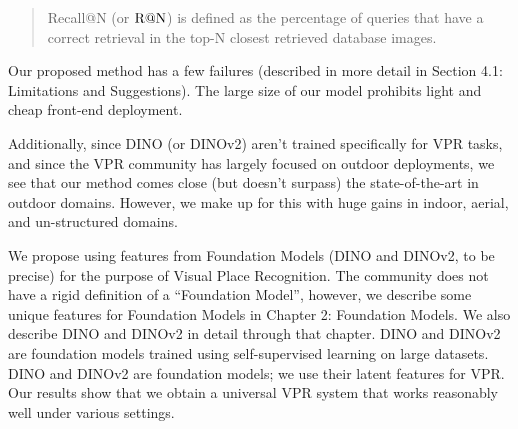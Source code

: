 \begin{quote}
    Recall@N (or $\textup{R@N}$) is defined as the percentage of
    queries that have a correct retrieval in the top-N closest
    retrieved database images.
\end{quote}


Our proposed method has a few failures (described in more detail in
Section 4.1: Limitations and Suggestions). The large size of our model
prohibits light and cheap front-end deployment.

Additionally, since DINO (or DINOv2) aren't trained specifically for
VPR tasks, and since the VPR community has largely focused on outdoor
deployments, we see that our method comes close (but doesn't surpass)
the state-of-the-art in outdoor domains. However, we make up for this
with huge gains in indoor, aerial, and un-structured domains.


We propose using features from Foundation Models (DINO and DINOv2, to
be precise) for the purpose of Visual Place Recognition. The community
does not have a rigid definition of a ``Foundation Model'', however,
we describe some unique features for Foundation Models in Chapter 2:
Foundation Models. We also describe DINO and DINOv2 in detail through
that chapter. DINO and DINOv2 are foundation models trained using
self-supervised learning on large datasets. DINO and DINOv2 are
foundation models; we use their latent features for VPR. Our results
show that we obtain a universal VPR system that works reasonably well
under various settings.

